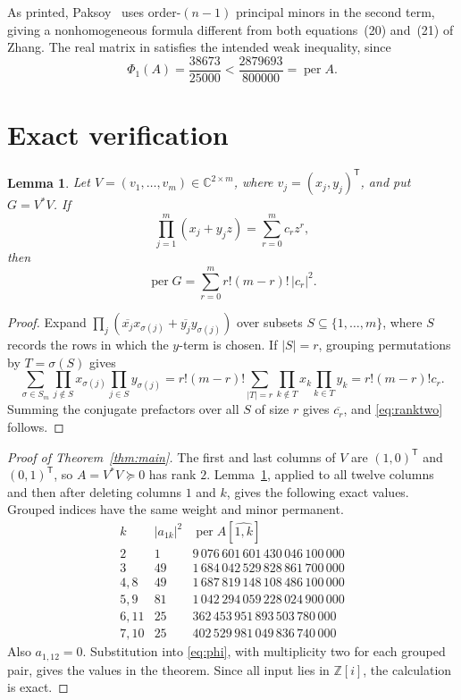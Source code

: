 \documentclass[11pt]{amsart}
\newcommand{\permanent}{\operatorname{per}}
\newcommand{\PhiOne}{\Phi_1}
\newtheorem{lemma}[theorem]{Lemma}
\begin{document}
As printed, Paksoy~\cite[Eq.~(1.1)]{Paksoy2023} uses order-$(n-1)$ principal
minors in the second term, giving a nonhomogeneous formula different from
both equations~(20) and~(21) of Zhang. The real matrix in
\cite[Eq.~(1.3)]{Paksoy2023} satisfies the intended weak inequality, since
\[
  \PhiOne(A)=\frac{38673}{25000}
  <\frac{2879693}{800000}=\permanent A.
\]

\section{Exact verification}

\begin{lemma}\label{lem:ranktwo}
Let $V=(v_1,\ldots,v_m)\in\mathbb C^{2\times m}$, where
$v_j=(x_j,y_j)^{\mathsf T}$, and put $G=V^*V$. If
\[
  \prod_{j=1}^m(x_j+y_jz)=\sum_{r=0}^m c_rz^r,
\]
then
\begin{equation}\label{eq:ranktwo}
  \permanent G=\sum_{r=0}^m r!(m-r)!\,|c_r|^2.
\end{equation}
\end{lemma}

\begin{proof}
Expand
$\prod_j(\overline{x_j}x_{\sigma(j)}+\overline{y_j}y_{\sigma(j)})$
over subsets $S\subseteq\{1,\ldots,m\}$, where $S$ records the rows in which
the $y$-term is chosen. If $|S|=r$, grouping permutations by
$T=\sigma(S)$ gives
\[
 \sum_{\sigma\in S_m}
 \prod_{j\notin S}x_{\sigma(j)}
 \prod_{j\in S}y_{\sigma(j)}
 =r!(m-r)!\sum_{|T|=r}
 \prod_{k\notin T}x_k\prod_{k\in T}y_k
 =r!(m-r)!c_r.
\]
Summing the conjugate prefactors over all $S$ of size $r$ gives
$\overline{c_r}$, and \eqref{eq:ranktwo} follows.
\end{proof}

\begin{proof}[Proof of Theorem~\ref{thm:main}]
The first and last columns of $V$ are $(1,0)^{\mathsf T}$ and
$(0,1)^{\mathsf T}$, so $A=V^*V\succeq0$ has rank $2$.
Lemma~\ref{lem:ranktwo}, applied to all twelve columns and then after deleting
columns $1$ and $k$, gives the following exact values. Grouped indices have
the same weight and minor permanent.
\[
\begin{array}{c|c|r}
 k & |a_{1k}|^2 & \permanent A[\widehat{1,k}]\\ \hline
 2       & 1  & 9\,076\,601\,601\,430\,046\,100\,000\\
 3       & 49 & 1\,684\,042\,529\,828\,861\,700\,000\\
 4,8     & 49 & 1\,687\,819\,148\,108\,486\,100\,000\\
 5,9     & 81 & 1\,042\,294\,059\,228\,024\,900\,000\\
 6,11    & 25 &   362\,453\,951\,893\,503\,780\,000\\
 7,10    & 25 &   402\,529\,981\,049\,836\,740\,000
\end{array}
\]
Also $a_{1,12}=0$. Substitution into \eqref{eq:phi}, with multiplicity two
for each grouped pair, gives the values in the theorem. Since all input lies
in $\mathbb Z[i]$, the calculation is exact.
\end{proof}
\end{document}
